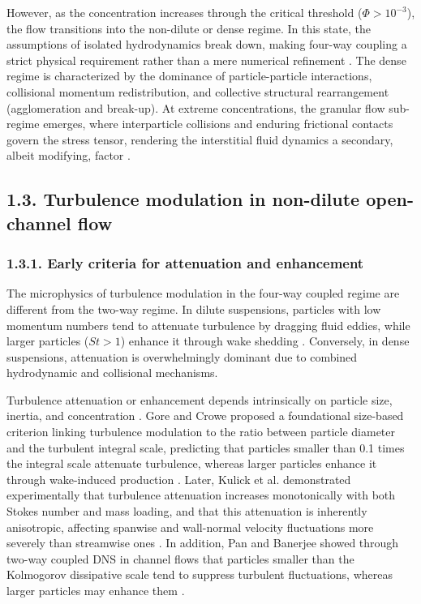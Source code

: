 However, as the concentration increases through the critical threshold (\(\Phi > 10^{- 3}\)), the flow transitions into the non-dilute or dense regime. In this state, the assumptions of isolated hydrodynamics break down, making four-way coupling a strict physical requirement rather than a mere numerical refinement \cite{messa__2021,vreman__2015}. The dense regime is characterized by the dominance of particle-particle interactions, collisional momentum redistribution, and collective structural rearrangement (agglomeration and break-up). At extreme concentrations, the granular flow sub-regime emerges, where interparticle collisions and enduring frictional contacts govern the stress tensor, rendering the interstitial fluid dynamics a secondary, albeit modifying, factor \cite{maurin__2017,zhao__2023}.

\subsection{1.3. Turbulence modulation in non-dilute open-channel flow}

\subsubsection{1.3.1. Early criteria for attenuation and enhancement}

The microphysics of turbulence modulation in the four-way coupled regime are different from the two-way regime. In dilute suspensions, particles with low momentum numbers tend to attenuate turbulence by dragging fluid eddies, while larger particles (\(St > 1\)) enhance it through wake shedding \cite{balachandar__2010,PEND_Liu2022}. Conversely, in dense suspensions, attenuation is overwhelmingly dominant due to combined hydrodynamic and collisional mechanisms.

Turbulence attenuation or enhancement depends intrinsically on particle size, inertia, and concentration \cite{PEND_Li2025,motoori__2024,PEND_Rohilla2023}. Gore and Crowe \cite{gore__1989} proposed a foundational size-based criterion linking turbulence modulation to the ratio between particle diameter and the turbulent integral scale, predicting that particles smaller than 0.1 times the integral scale attenuate turbulence, whereas larger particles enhance it through wake-induced production \cite{motoori__2024,nezu__2004,PEND_Rohilla2023,vreman__2015}. Later, Kulick et al. \cite{kulick__1994} demonstrated experimentally that turbulence attenuation increases monotonically with both Stokes number and mass loading, and that this attenuation is inherently anisotropic, affecting spanwise and wall-normal velocity fluctuations more severely than streamwise ones \cite{PEND_Vreman2007,yamamoto__2001}. In addition, Pan and Banerjee \cite{pan__1996} showed through two-way coupled DNS in channel flows that particles smaller than the Kolmogorov dissipative scale tend to suppress turbulent fluctuations, whereas larger particles may enhance them \cite{baker__2019,PEND_Shao2012,PEND_Wang2020,yamamoto__2001}.

